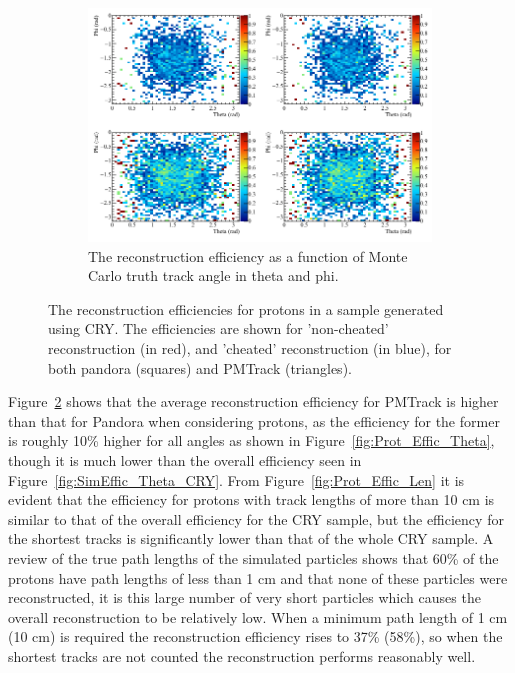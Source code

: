 \begin{figure}[h!]
\begin{subfigure}{0.8\textwidth}
        \includegraphics[width=\textwidth]{Effic_ProtonEnrich_500V_Proton_PhiTheta}
        \caption{The reconstruction efficiency as a function of Monte Carlo truth track angle in theta and phi.}
        \label{fig:Prot_Effic_PhiTheta}
  \end{subfigure}%
  \caption[The reconstruction efficiencies for protons in a sample generated using CRY.]
          {The reconstruction efficiencies for protons in a sample generated using CRY. The efficiencies are shown for 'non-cheated' reconstruction (in red), and 'cheated' reconstruction (in blue), for both pandora (squares) and PMTrack (triangles).}
  \label{fig:Prot_Effic}
\end{figure}

Figure~\ref{fig:Prot_Effic} shows that the average reconstruction efficiency for PMTrack is higher than that for Pandora when considering protons, as the efficiency for the former is roughly 10\% higher for all angles as shown in Figure~\ref{fig:Prot_Effic_Theta}, though it is much lower than the overall efficiency seen in Figure~\ref{fig:SimEffic_Theta_CRY}. From Figure~\ref{fig:Prot_Effic_Len} it is evident that the efficiency for protons with track lengths of more than 10 cm is similar to that of the overall efficiency for the CRY sample, but the efficiency for the shortest tracks is significantly lower than that of the whole CRY sample. A review of the true path lengths of the simulated particles shows that 60\% of the protons have path lengths of less than 1 cm and that none of these particles were reconstructed, it is this large number of very short particles which causes the overall reconstruction to be relatively low. When a minimum path length of 1 cm (10 cm) is required the reconstruction efficiency rises to 37\% (58\%), so when the shortest tracks are not counted the reconstruction performs reasonably well. \\

